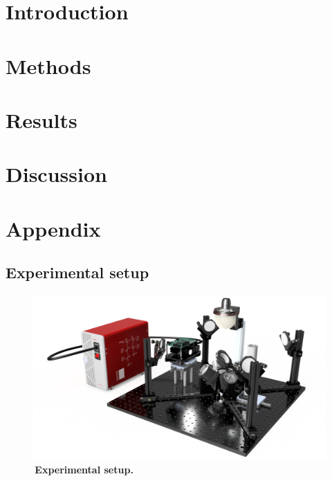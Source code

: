 \documentclass[]{article}       %
\newcommand{\mycaption}[2]{\caption[#1]{\textbar\,\textbf{#1} #2}}
\begin{document}

\section{Introduction}
   \label{chap:introduction}
   

\pagebreak
\section{Methods}
  \label{chap:methods}
  

\pagebreak
\section{Results}
  \label{chap:results}
  

\pagebreak
\section{Discussion}
  \label{chap:discussion}
  

\pagebreak
\printbibliography 

\pagebreak 
    \section{Appendix}
    \subsection{Experimental setup}

\begin{figure}[H]
    \centering
    \includegraphics[width=\linewidth]{figures/Setup_CAD.png}
    \mycaption{Experimental setup.}{}
    \label{fig:setup}
\end{figure}


%  

% 
% 
% 
\end{document}
